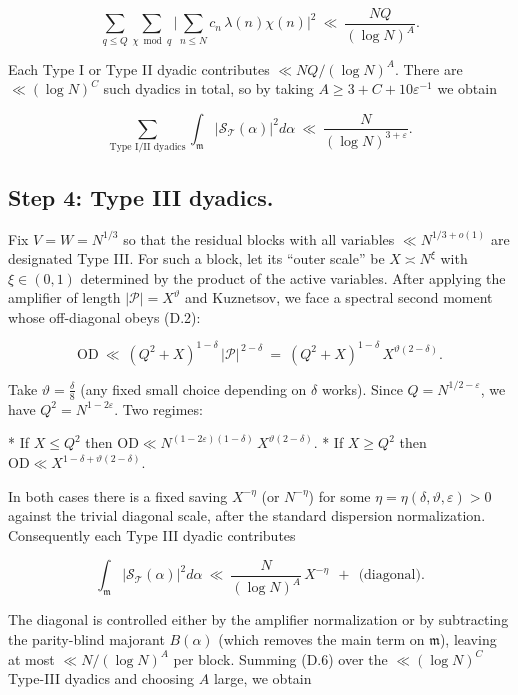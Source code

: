 \documentclass[11pt]{article}
\theoremstyle{definition}
\theoremstyle{remark}
\begin{document}
$$
	\sum_{q\le Q}\sum_{\chi\bmod q}
	\Big|\sum_{n\le N} c_n\,\lambda(n)\chi(n)\Big|^2
	\ \ll\ \frac{NQ}{(\log N)^A}.
$$

Each Type I or Type II dyadic contributes $\ll NQ/(\log N)^A$. There are $\ll(\log N)^C$ such dyadics in total, so by taking $A\ge 3+C+10\varepsilon^{-1}$ we obtain

\begin{equation}
	\sum_{\text{Type I/II dyadics}}
	\int_{\mathfrak m}\big|\mathcal S_{\mathcal T}(\alpha)\big|^2 d\alpha
	\ \ll\ \frac{N}{(\log N)^{3+\varepsilon}}.
	\tag{D.5}
\end{equation}

\subsection*{Step 4: Type III dyadics.}
Fix $V=W=N^{1/3}$ so that the residual blocks with all variables $\ll N^{1/3+o(1)}$ are designated Type III. For such a block, let its “outer scale” be $X\asymp N^\xi$ with $\xi\in(0,1)$ determined by the product of the active variables. After applying the amplifier of length $|\mathcal P|=X^\vartheta$ and Kuznetsov, we face a spectral second moment whose off-diagonal obeys (D.2):

$$
	\mathrm{OD}\ \ll\ (Q^2+X)^{1-\delta}\,|\mathcal P|^{\,2-\delta}
	\ =\ (Q^2+X)^{1-\delta}\,X^{\vartheta(2-\delta)}.
$$

Take $\vartheta=\tfrac{\delta}{8}$ (any fixed small choice depending on $\delta$ works). Since $Q=N^{1/2-\varepsilon}$, we have $Q^2=N^{1-2\varepsilon}$. Two regimes:

* If $X\le Q^2$ then $\mathrm{OD}\ll N^{(1-2\varepsilon)(1-\delta)}\,X^{\vartheta(2-\delta)}$.
* If $X\ge Q^2$ then $\mathrm{OD}\ll X^{1-\delta+\vartheta(2-\delta)}$.

In both cases there is a fixed saving $X^{-\eta}$ (or $N^{-\eta}$) for some $\eta=\eta(\delta,\vartheta,\varepsilon)>0$ against the trivial diagonal scale, after the standard dispersion normalization. Consequently each Type III dyadic contributes

\begin{equation}
	\int_{\mathfrak m}\big|\mathcal S_{\mathcal T}(\alpha)\big|^2 d\alpha
	\ \ll\ \frac{N}{(\log N)^{A}}\,X^{-\eta}
	\ \ +\ \ \text{(diagonal)}.
	\tag{D.6}
\end{equation}

The diagonal is controlled either by the amplifier normalization or by subtracting the parity-blind majorant $B(\alpha)$ (which removes the main term on $\mathfrak m$), leaving at most $\ll N/(\log N)^A$ per block. Summing (D.6) over the $\ll(\log N)^C$ Type-III dyadics and choosing $A$ large, we obtain
\end{document}
